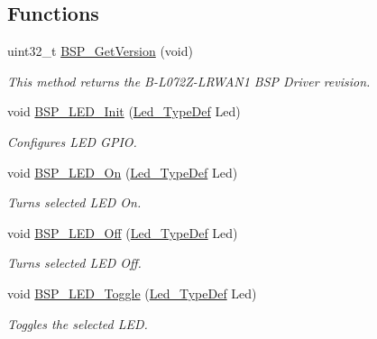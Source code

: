 \subsection*{Functions}
\begin{DoxyCompactItemize}
\item 
uint32\+\_\+t \hyperlink{group__B-L072Z-LRWAN1__LOW__LEVEL__Exported__Functions_ga65d13608f7010a8068614154cb142cd6}{B\+S\+P\+\_\+\+Get\+Version} (void)
\begin{DoxyCompactList}\small\item\em This method returns the B-\/\+L072\+Z-\/\+L\+R\+W\+A\+N1 B\+SP Driver revision. \end{DoxyCompactList}\item 
void \hyperlink{group__B-L072Z-LRWAN1__LOW__LEVEL__Exported__Functions_gab58a4f16a476a53653c5c400e3bed158}{B\+S\+P\+\_\+\+L\+E\+D\+\_\+\+Init} (\hyperlink{group__B-L072Z-LRWAN1__LOW__LEVEL__Exported__Types_gaa059704b7ca945eb9c1e7f2c3d03fecd}{Led\+\_\+\+Type\+Def} Led)
\begin{DoxyCompactList}\small\item\em Configures L\+ED G\+P\+IO. \end{DoxyCompactList}\item 
void \hyperlink{group__B-L072Z-LRWAN1__LOW__LEVEL__Exported__Functions_gaee9c16b16384834c69efabf58f423d6f}{B\+S\+P\+\_\+\+L\+E\+D\+\_\+\+On} (\hyperlink{group__B-L072Z-LRWAN1__LOW__LEVEL__Exported__Types_gaa059704b7ca945eb9c1e7f2c3d03fecd}{Led\+\_\+\+Type\+Def} Led)
\begin{DoxyCompactList}\small\item\em Turns selected L\+ED On. \end{DoxyCompactList}\item 
void \hyperlink{group__B-L072Z-LRWAN1__LOW__LEVEL__Exported__Functions_gaef268680154ca15c45066d64d41f9467}{B\+S\+P\+\_\+\+L\+E\+D\+\_\+\+Off} (\hyperlink{group__B-L072Z-LRWAN1__LOW__LEVEL__Exported__Types_gaa059704b7ca945eb9c1e7f2c3d03fecd}{Led\+\_\+\+Type\+Def} Led)
\begin{DoxyCompactList}\small\item\em Turns selected L\+ED Off. \end{DoxyCompactList}\item 
void \hyperlink{group__B-L072Z-LRWAN1__LOW__LEVEL__Exported__Functions_ga1b9eabba7d498f41d6f16587ec0f9732}{B\+S\+P\+\_\+\+L\+E\+D\+\_\+\+Toggle} (\hyperlink{group__B-L072Z-LRWAN1__LOW__LEVEL__Exported__Types_gaa059704b7ca945eb9c1e7f2c3d03fecd}{Led\+\_\+\+Type\+Def} Led)
\begin{DoxyCompactList}\small\item\em Toggles the selected L\+ED. \end{DoxyCompactList}\item 

\end{DoxyCompactItemize}
